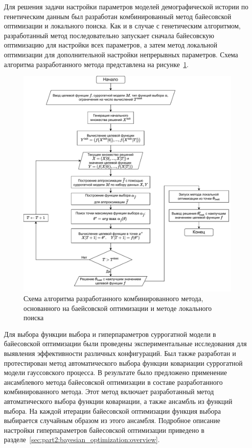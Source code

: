 Для решения задачи настройки параметров моделей демографической истории по генетическим данным был разработан комбинированный метод байесовской оптимизации и локального поиска.
Как и в случае с генетическим алгоритмом, разработанный метод последовательно запускает сначала байесовскую оптимизацию для настройки всех параметров, а затем метод локальной оптимизации для дополнительной настройки непрерывных параметров.
Схема алгоритма разработанного метода представлена на рисунке~\ref{fig:part2:bayesian_optimization:scheme}.

\begin{figure}[b]
  \centering
   \includegraphics[width=\linewidth]{images/part2/bayesian_optimization/bayesian_optimization_scheme.drawio.pdf}
   \caption{Схема алгоритма разработанного комбинированного метода, основанного на баейсовской оптимизации и методе локального поиска}
  \label{fig:part2:bayesian_optimization:scheme}
\end{figure}

Для выбора функции выбора и гиперпараметров суррогатной модели в байесовской оптимизации были проведены экспериментальные исследования для выявления эффективности различных конфигураций.
Был также разработан и протестирован метод автоматического выбора функции ковариации суррогатной модели гауссовского процесса.
В результате было предложено применение ансамблевого метода байесовской оптимизации в составе разработанного комбинированного метода.
Этот метод включает разработанный метод автоматического выбора функции ковариации, а также ансамбль из функций выбора.
На каждой итерации байесовской оптимизации функция выбора выбирается случайным образом из этого ансамбля.
Подробное описание настройки гиперпараметров байесовской оптимизации приведено в разделе~\ref{sec:part2:bayesian_optimization:overview}.\\


